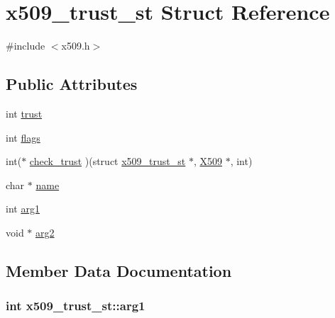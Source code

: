 \hypertarget{structx509__trust__st}{}\section{x509\+\_\+trust\+\_\+st Struct Reference}
\label{structx509__trust__st}


{\ttfamily \#include $<$x509.\+h$>$}

\subsection*{Public Attributes}
\begin{DoxyCompactItemize}
\item 
int \hyperlink{structx509__trust__st_a6840735427ee479d8796da9e838d6a77}{trust}
\item 
int \hyperlink{structx509__trust__st_aee3ce09b9d6184cd66ad624b5689a676}{flags}
\item 
int($\ast$ \hyperlink{structx509__trust__st_a416ceaadc539241699efb993fb2dc707}{check\+\_\+trust} )(struct \hyperlink{structx509__trust__st}{x509\+\_\+trust\+\_\+st} $\ast$, \hyperlink{ossl__typ_8h_a4f666bde6518f95deb3050c54b408416}{X509} $\ast$, int)
\item 
char $\ast$ \hyperlink{structx509__trust__st_a31ddd3f516ef8144ef40285f8f8f304d}{name}
\item 
int \hyperlink{structx509__trust__st_a97e2b1d9d69d10172d982776c337c6d9}{arg1}
\item 
void $\ast$ \hyperlink{structx509__trust__st_af83753e80804cc408124be78954df1ef}{arg2}
\end{DoxyCompactItemize}


\subsection{Member Data Documentation}
\subsubsection[{\texorpdfstring{arg1}{arg1}}]{\setlength{\rightskip}{0pt plus 5cm}int x509\+\_\+trust\+\_\+st\+::arg1}\hypertarget{structx509__trust__st_a97e2b1d9d69d10172d982776c337c6d9}{}\label{structx509__trust__st_a97e2b1d9d69d10172d982776c337c6d9}
